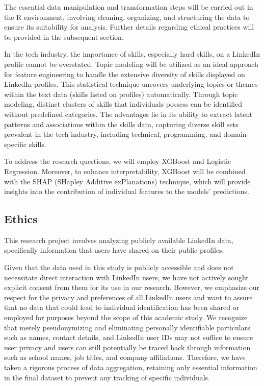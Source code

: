 \documentclass[11pt,]{article}
\begin{document}
The essential data manipulation and transformation steps will be carried
out in the R environment, involving cleaning, organizing, and
structuring the data to ensure its suitability for analysis. Further
details regarding ethical practices will be provided in the subsequent
section.

In the tech industry, the importance of skills, especially hard skills,
on a LinkedIn profile cannot be overstated. Topic modeling will be
utilized as an ideal approach for feature engineering to handle the
extensive diversity of skills displayed on LinkedIn profiles. This
statistical technique uncovers underlying topics or themes within the
text data (skills listed on profiles) automatically. Through topic
modeling, distinct clusters of skills that individuals possess can be
identified without predefined categories. The advantages lie in its
ability to extract latent patterns and associations within the skills
data, capturing diverse skill sets prevalent in the tech industry,
including technical, programming, and domain-specific skills.

To address the research questions, we will employ XGBoost and Logistic
Regression. Moreover, to enhance interpretability, XGBoost will be
combined with the SHAP (SHapley Additive exPlanations) technique, which
will provide insights into the contribution of individual features to
the models' predictions.

\hypertarget{ethics}{%
\subsection{Ethics}\label{ethics}}

This research project involves analyzing publicly available LinkedIn
data, specifically information that users have shared on their public
profiles.

Given that the data used in this study is publicly accessible and does
not necessitate direct interaction with LinkedIn users, we have not
actively sought explicit consent from them for its use in our research.
However, we emphasize our respect for the privacy and preferences of all
LinkedIn users and want to assure that no data that could lead to
individual identification has been shared or employed for purposes
beyond the scope of this academic study. We recognize that merely
pseudonymizing and eliminating personally identifiable particulars such
as names, contact details, and LinkedIn user IDs may not suffice to
ensure user privacy and users can still potentially be traced back
through information such as school names, job titles, and company
affiliations. Therefore, we have taken a rigorous process of data
aggregation, retaining only essential information in the final dataset
to prevent any tracking of specific individuals.
\end{document}
